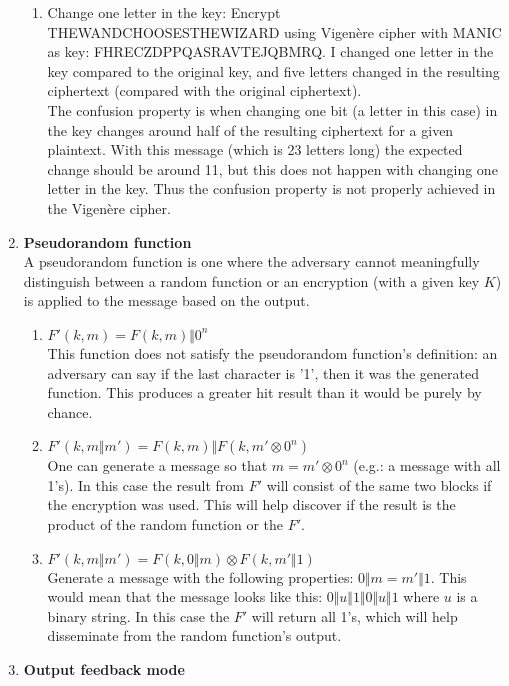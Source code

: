 \documentclass{article}
\begin{document}
\begin{enumerate}[label=\textbf{Task \arabic*:}]
\begin{enumerate}[label=\textit{Part \roman*:}]
			\item Change one letter in the key: Encrypt \textsc{THEWANDCHOOSESTHEWIZARD} using Vigenère cipher with \textsc{MANIC} as key: \textsc{FHRECZDPPQASRAVTEJQBMRQ}. I changed one letter in the key compared to the original key, and five letters changed in the resulting ciphertext (compared with the original ciphertext).\\
			The confusion property is when changing one bit (a letter in this case) in the key changes around half of the resulting ciphertext for a given plaintext. With this message (which is 23 letters long) the expected change should be around 11, but this does not happen with changing one letter in the key. Thus the confusion property is not properly achieved in the Vigenère cipher.	
		\end{enumerate}
		\item \textbf{Pseudorandom function} \\
		A pseudorandom function is one where the adversary cannot meaningfully distinguish between a random function or an encryption (with a given key $K$) is applied to the message based on the output.
		\begin{enumerate}[label=-]
			\item $ F'(k, m) = F(k, m) \Vert 0^n $ \\
			This function does not satisfy the pseudorandom function's definition: an adversary can say if the last character is '1', then it was the generated function. This produces a greater hit result than it would be purely by chance.
			\item $ F'(k, m \Vert m') = F(k, m) \Vert F(k, m' \otimes 0^n) $ \\
			One can generate a message so that $m = m' \otimes 0^n$ (e.g.: a message with all 1's). In this case the result from $F'$ will consist of the same two blocks if the encryption was used. This will help discover if the result is the product of the random function or the $F'$.
			\item $ F'(k, m \Vert m') = F(k, 0 \Vert m) \otimes F(k, m' \Vert 1) $\\
			Generate a message with the following properties: $ 0 \Vert m = m' \Vert 1 $. This would mean that the message looks like this: $ 0 \Vert u \Vert 1 \Vert 0 \Vert u \Vert 1 $ where $u$ is a binary string. In this case the $F'$ will return all 1's, which will help disseminate from the random function's output.
		\end{enumerate}
		\item \textbf{Output feedback mode}\\

\end{enumerate}
\end{document}
